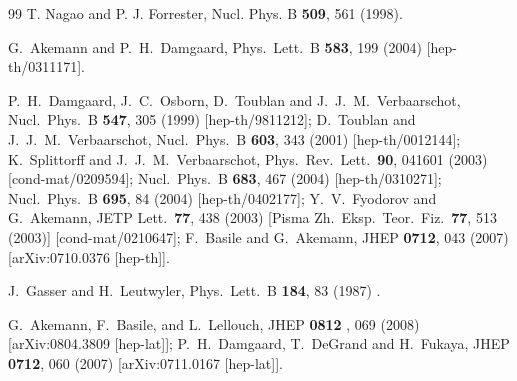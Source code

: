 \documentclass[11pt]{article}
\begin{document}
\begin{thebibliography}{99}
 T. Nagao and P. J. Forrester, %
{    Nucl. Phys. B} {\bf 509}, 561 (1998). 
 
   G.~Akemann and P.~H.~Damgaard,
  Phys.\ Lett.\  B {\bf 583}, 199 (2004)
  [hep-th/0311171].

  P.~H.~Damgaard, J.~C.~Osborn, D.~Toublan and J.~J.~M.~Verbaarschot,
  Nucl.\ Phys.\  B {\bf 547}, 305 (1999)
  [hep-th/9811212];\newline
 D.~Toublan and J.~J.~M.~Verbaarschot,
  Nucl.\ Phys.\  B {\bf 603}, 343 (2001)
  [hep-th/0012144];\newline
  K.~Splittorff and J.~J.~M.~Verbaarschot,
  Phys.\ Rev.\ Lett.\  {\bf 90}, 041601 (2003)
  [cond-mat/0209594];
  Nucl.\ Phys.\  B {\bf 683}, 467 (2004)
  [hep-th/0310271];
  Nucl.\ Phys.\  B {\bf 695}, 84 (2004)
  [hep-th/0402177];\newline
  Y.~V.~Fyodorov and G.~Akemann,
  JETP Lett.\  {\bf 77}, 438 (2003)
  [Pisma Zh.\ Eksp.\ Teor.\ Fiz.\  {\bf 77}, 513 (2003)]
  [cond-mat/0210647];\newline
%
  F.~Basile and G.~Akemann,
  JHEP {\bf 0712}, 043 (2007)
  [arXiv:0710.0376 [hep-th]].

  J.~Gasser and H.~Leutwyler,
  Phys.\ Lett.\ B {\bf 184}, 83 (1987) .

  G.~Akemann, F.~Basile, and L.~Lellouch,
  JHEP {\bf 0812 }, 069 (2008)  
  [arXiv:0804.3809 [hep-lat]];
%
  P.~H.~Damgaard, T.~DeGrand and H.~Fukaya,
  JHEP {\bf 0712}, 060 (2007)
  [arXiv:0711.0167 [hep-lat]].


\end{thebibliography}
\end{document}

